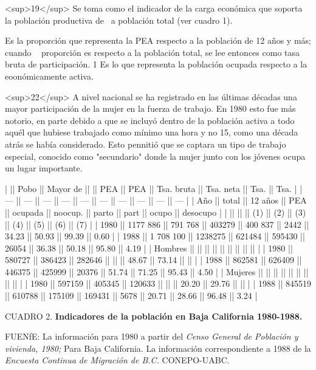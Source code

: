 \documentclass{article}
\begin{document}
<sup>19</sup> Se toma como el indicador de la carga económica que soporta la población productiva de ~a población total (ver cuadro 1).

Es la proporción que representa la PEA respecto a la población de 12 años y más; cuando ~ proporción es respecto a la población total, se lee entonces como tasa bruta de participación. 1 Es lo que representa la población ocupada respecto a la eoonómicamente activa.

<sup>22</sup> A nivel nacional se ha registrado en las últimas décadas una mayor participación de la mujer en la fuerza de trabajo. En 1980 esto fue más notorio, en parte debido a que se incluyó dentro de la población activa a todo aquél que hubiese trabajado como mínimo una hora y no 15, como una década atrás se había considerado. Esto pennitió que se captara un tipo de trabajo especial, conocido como "secundario" donde la mujer junto con los jóvenes ocupa un lugar importante.

|         || Pobo      || Mayor de ||        || PEA     || PEA     || Tsa. bruta || Tsa. neta || Tsa.  || Tsa.     |
| ---     || ---       || ---      || ---    || ---     || ---     || ---        || ---       || ---   || ---      |
| Año     || total     || 12 años  || PEA    || ocupada || noocup. || parto      || part      || ocupo || desocupo |
|         ||           ||          || (1)    || (2)     || (3)     || (4)        || (5)       || (6)   || (7)      |
| 1980    || 1177 886  || 791 768  || 403279 || 400 837 || 2442    || 34.23      || 50.93     || 99.39 || 0.60     |
| 1988    || 1 708 100 || 1238275  || 621484 || 595430  || 26054   || 36.38      || 50.18     || 95.80 || 4.19     |
| Hombres ||           ||          ||        ||         ||         ||            ||           ||       ||          |
| 1980    || 580727    || 386423   || 282646 ||         ||         || 48.67      || 73.14     ||       ||          |
| 1988    || 862581    || 626409   || 446375 || 425999  || 20376   || 51.74      || 71.25     || 95.43 || 4.50     |
| Mujeres ||           ||          ||        ||         ||         ||            ||           ||       ||          |
| 1980    || 597159    || 405345   || 120633 ||         ||         || 20.20      || 29.76     ||       ||          |
| 1988    || 845519    || 610788   || 175109 || 169431  || 5678    || 20.71      || 28.66     || 96.48 || 3.24     |

CUADRO 2. \textbf{Indicadores de la población en Baja California 1980-1988.}

FUENfE: La información para 1980 a partir del \textit{Censo General de Población y vivienda, 1980;} Para Baja California. La información correspondiente a 1988 de la \textit{Encuesta Continua de Migración de B.C.} CONEPO-UABC.
\end{document}
